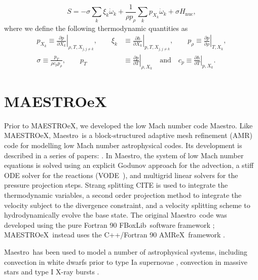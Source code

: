 \documentclass[a4paper]{jpconf}
\newcommand{\maestro}{{\sffamily Maestro}}
\newcommand{\maestroex}{{\sffamily MAESTROeX}}
\newcommand{\amrex}{{\sffamily AMReX}}
\newcommand{\fboxlib}{{\sffamily FBoxLib}}
\newcommand{\pd}[2]{\frac{\partial #1}{\partial #2}}
\begin{document}
\begin{equation}
    S = -\sigma \sum_k \xi_k\dot{\omega}_k + \frac{1}{\rho p_\rho}\sum_k p_{X_k}\dot{\omega}_k + \sigma H_{\mathrm{nuc}},
\end{equation}
where we define the following thermodynamic quantities as
\begin{align*}
    p_{X_k} \equiv \left.\pd{p}{X_k}\right|_{\rho,T,X_{j,j\neq k}},\qquad
     \xi_k&\equiv \left.\pd{h}{X_k}\right|_{p, T,X_{j,j\neq k}},\qquad
     p_\rho\equiv \left.\pd{p}{\rho}\right|_{T, X_k},\\
     \sigma \equiv \frac{p_T}{\rho c_p p_\rho}, \qquad
     p_T&\equiv \left.\pd{p}{T}\right|_{\rho, X_k} \quad\mathrm{and}\quad 
     c_p\equiv \left.\pd{h}{T}\right|_{p, X_k}.
\end{align*}


\section{MAESTROeX} \label{sec:maestroex}



Prior to \maestroex, we developed the low Mach number code \maestro. Like \maestroex, \maestro~is a block-structured adaptive mesh refinement (AMR) code for modelling low Mach number astrophysical codes. Its development is described in a series of papers: \cite{Almgren2006a,Almgren2006b,Almgren2008a,Zingale2009,Nonaka2010}. In \maestro, the system of low Mach number equations is solved using an explicit Godunov approach for the advection, a stiff ODE solver for the reactions (VODE~\cite{vode}), and multigrid linear solvers for the pressure projection steps. Strang splitting CITE is used to integrate the thermodynamic variables, a second order projection method to integrate the velocity subject to the divergence constraint, and a velocity splitting scheme to hydrodynamically evolve the base state. The original \maestro~code was developed using the pure Fortran 90 \fboxlib~software framework \cite{Zhang2016}; \maestroex~instead uses the C++/Fortran 90 \amrex~framework \cite{Zhang2019}. 

\maestro~has been used to model a number of astrophysical systems, including convection in white dwarfs prior to type Ia supernovae \cite{Zingale2011,Nonaka2011,Malone2014a,Zingale2013,Jacobs2016}, convection in massive stars \cite{Gilet2013} and type I X-ray bursts \cite{Malone2011,Malone2014,Zingale2015}. 
\end{document}

